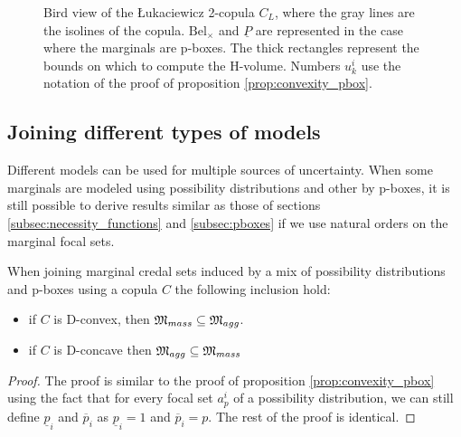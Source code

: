 \begin{figure}[!ht]
    \caption{Bird view of the \L ukaciewicz 2-copula $C_L$, where the gray lines are the isolines of the copula. $\mathrm{Bel}_\times$ and $\underline{P}$ are represented in the case where the marginals are p-boxes. The thick rectangles represent the bounds on which to compute the H-volume. Numbers $u^i_k$ use the notation of the proof of proposition \ref{prop:convexity_pbox}.}
    \label{fig:copula_convex}
\end{figure}

\subsection{Joining different types of models}
Different models can be used for multiple sources of uncertainty. When some marginals are modeled using possibility distributions and other by p-boxes, it is still possible to derive results similar as those of sections \ref{subsec:necessity_functions} and \ref{subsec:pboxes} if we use natural orders on the marginal focal sets. 
\begin{proposition}
    When joining marginal credal sets induced by a mix of possibility distributions and p-boxes using a copula $C$ the following inclusion hold:
    \begin{itemize}
        \item if $C$ is D-convex, then ${\mathfrak{M}}_{mass}\subseteq {\mathfrak{M}}_{agg}$.
        \item if $C$ is D-concave then ${\mathfrak{M}}_{agg}\subseteq{\mathfrak{M}}_{mass}$ 
    \end{itemize}
\end{proposition}

\begin{proof}
    The proof is similar to the proof of proposition \ref{prop:convexity_pbox} using the fact that for every focal set $a^i_p$ of a possibility distribution, we can still define $\underline{p}_i$ and $\overline{p}_i$ as $\underline{p}_i=1$ and $\overline{p}_i=p$. The rest of the proof is identical.
\end{proof}

